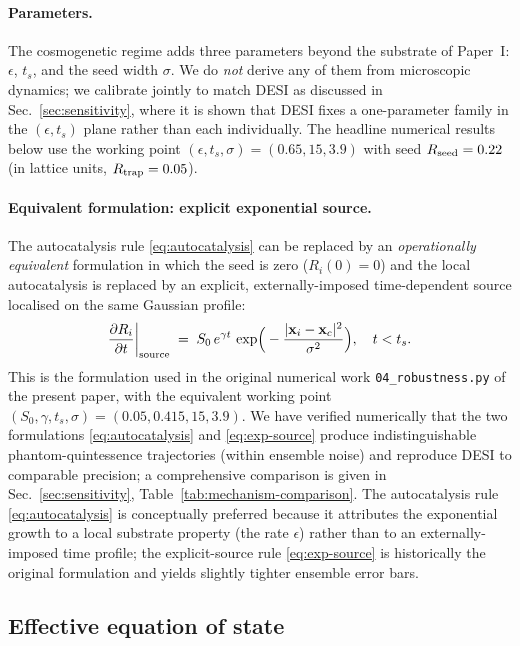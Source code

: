 \documentclass[11pt,a4paper]{article}
\begin{document}
\paragraph{Parameters.} The cosmogenetic regime adds three
parameters beyond the substrate of Paper~I: $\epsilon$, $t_s$, and
the seed width $\sigma$. We do \emph{not} derive any of them from
microscopic dynamics; we calibrate jointly to match DESI as
discussed in Sec.~\ref{sec:sensitivity}, where it is shown that DESI
fixes a one-parameter family in the $(\epsilon, t_s)$ plane rather
than each individually. The headline numerical results below use the
working point $(\epsilon, t_s, \sigma) = (0.65, 15, 3.9)$ with
seed $R_{\rm seed} = 0.22$ (in lattice units, $R_{\rm trap} = 0.05$).

\paragraph{Equivalent formulation: explicit exponential source.} The
autocatalysis rule \eqref{eq:autocatalysis} can be replaced by an
\emph{operationally equivalent} formulation in which the seed is
zero ($R_i(0) = 0$) and the local autocatalysis is replaced by an
explicit, externally-imposed time-dependent source localised on the
same Gaussian profile:
\begin{equation}
\frac{\partial R_i}{\partial t}\bigg|_{\rm source} \;=\;
S_0\, e^{\gamma t}\,
\exp\!\Big(-\frac{|\mathbf{x}_i - \mathbf{x}_c|^2}{\sigma^2}\Big),
\quad t < t_s.
\label{eq:exp-source}
\end{equation}
This is the formulation used in the original numerical work
\texttt{04\_robustness.py} of the present paper, with the equivalent
working point $(S_0, \gamma, t_s, \sigma) = (0.05, 0.415, 15, 3.9)$.
We have verified numerically that the two formulations
\eqref{eq:autocatalysis} and \eqref{eq:exp-source} produce
indistinguishable phantom-quintessence trajectories (within ensemble
noise) and reproduce DESI to comparable precision; a comprehensive
comparison is given in Sec.~\ref{sec:sensitivity},
Table~\ref{tab:mechanism-comparison}. The autocatalysis rule
\eqref{eq:autocatalysis} is conceptually preferred because it
attributes the exponential growth to a local substrate property
(the rate $\epsilon$) rather than to an externally-imposed time
profile; the explicit-source rule \eqref{eq:exp-source} is
historically the original formulation and yields slightly tighter
ensemble error bars.

\subsection{Effective equation of state}
\end{document}
